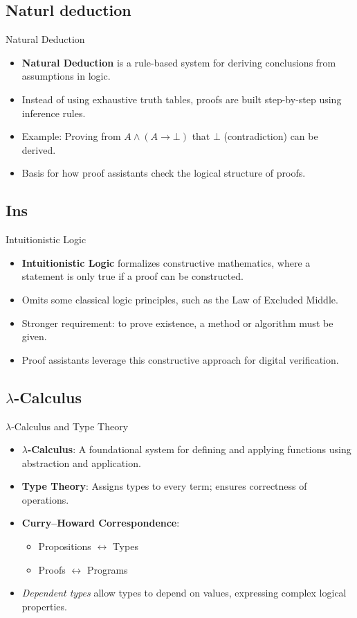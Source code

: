 \documentclass[aspectratio=169, compress, 12pt]{beamer}
\begin{document}
\subsection*{Naturl deduction}
\begin{frame}{Natural Deduction}
\begin{itemize}
    \item \textbf{Natural Deduction} is a rule-based system for deriving conclusions from assumptions in logic.
    \item Instead of using exhaustive truth tables, proofs are built step-by-step using inference rules.
    \item Example: Proving from $A \land (A \rightarrow \bot)$ that $\bot$ (contradiction) can be derived.
    \item Basis for how proof assistants check the logical structure of proofs.
\end{itemize}
\end{frame}
\subsection*{Ins}
\begin{frame}{Intuitionistic Logic}
\begin{itemize}
    \item \textbf{Intuitionistic Logic} formalizes constructive mathematics, where a statement is only true if a proof can be constructed.
    \item Omits some classical logic principles, such as the Law of Excluded Middle.
    \item Stronger requirement: to prove existence, a method or algorithm must be given.
    \item Proof assistants leverage this constructive approach for digital verification.
\end{itemize}
\end{frame}
\subsection*{$\lambda$-Calculus}
\begin{frame}{$\lambda$-Calculus and Type Theory}
\begin{itemize}
    \item \textbf{$\lambda$-Calculus}: A foundational system for defining and applying functions using abstraction and application.
    \item \textbf{Type Theory}: Assigns types to every term; ensures correctness of operations.
    \item \textbf{Curry--Howard Correspondence}: 
    \begin{itemize}
        \item Propositions $\leftrightarrow$ Types
        \item Proofs $\leftrightarrow$ Programs
    \end{itemize}
    \item \emph{Dependent types} allow types to depend on values, expressing complex logical properties.
\end{itemize}
\end{frame}
\end{document}
